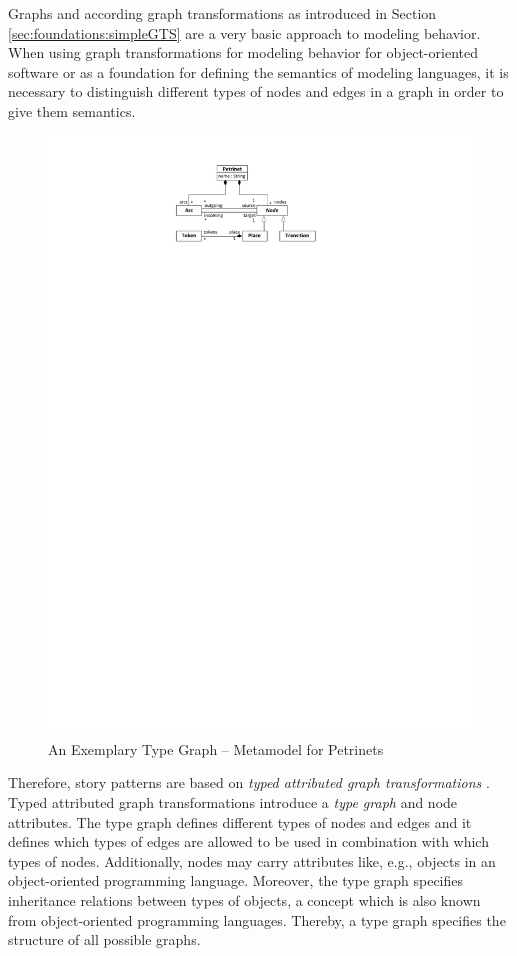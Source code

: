 Graphs and according graph transformations as introduced in Section \ref{sec:foundations:simpleGTS} are a very basic approach to modeling behavior.
When using graph transformations for modeling behavior for object-oriented software or as a foundation for defining the semantics of modeling languages,
it is necessary to distinguish different types of nodes and edges in a graph in order to give them semantics.

\begin{figure}[htb]
  \centering
  \includegraphics[scale=1]{figures/Petrinet}
  \caption{An Exemplary Type Graph -- Metamodel for Petrinets}
  \label{fig:PetrinetTypeGraph}
\end{figure}

Therefore, story patterns are based on \emph{typed attributed graph transformations} \cite{EEPT06}.
Typed attributed graph transformations introduce a \emph{type graph} and node attributes.
The type graph defines different types of nodes and edges and it defines which types of edges are allowed to be used in combination with which types of nodes.
Additionally, nodes may carry attributes like, e.g., objects in an object-oriented programming language.
Moreover, the type graph specifies inheritance relations between types of objects, a concept which is also known from object-oriented programming languages. Thereby, a type graph specifies the structure of all possible graphs.

